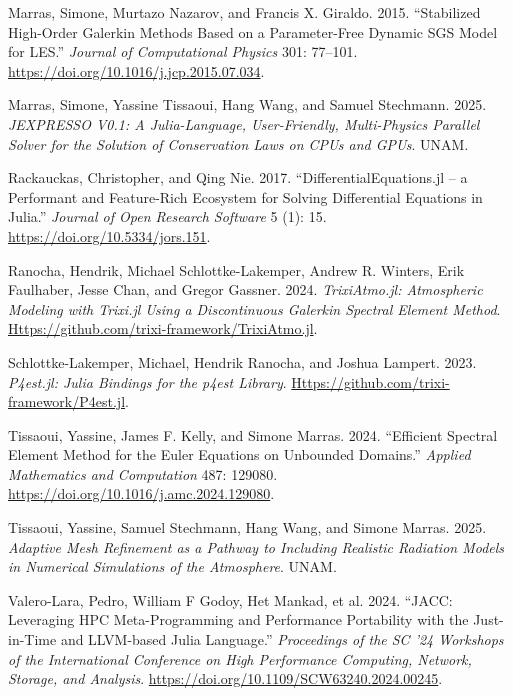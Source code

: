 \documentclass[10pt,onecolumn]{article}
\begin{document}
\begin{CSLReferences}{1}{1}
Marras, Simone, Murtazo Nazarov, and Francis X. Giraldo. 2015.
{``Stabilized High-Order {G}alerkin Methods Based on a Parameter-Free
Dynamic {SGS} Model for {LES}.''} \emph{Journal of Computational
Physics} 301: 77--101. \url{https://doi.org/10.1016/j.jcp.2015.07.034}.

Marras, Simone, Yassine Tissaoui, Hang Wang, and Samuel Stechmann. 2025.
\emph{{JEXPRESSO} V0.1: A {J}ulia-Language, User-Friendly, Multi-Physics
Parallel Solver for the Solution of Conservation Laws on {CPU}s and
{GPU}s}. UNAM.

Rackauckas, Christopher, and Qing Nie. 2017.
{``{DifferentialEquations.jl} -- a Performant and Feature-Rich Ecosystem
for Solving Differential Equations in {J}ulia.''} \emph{Journal of Open
Research Software} 5 (1): 15. \url{https://doi.org/10.5334/jors.151}.

Ranocha, Hendrik, Michael Schlottke-Lakemper, Andrew R. Winters, Erik
Faulhaber, Jesse Chan, and Gregor Gassner. 2024. \emph{{TrixiAtmo.jl}:
Atmospheric Modeling with {T}rixi.jl Using a Discontinuous {G}alerkin
Spectral Element Method}.
\href{https://github.com/trixi-framework/TrixiAtmo.jl}{Https://github.com/trixi-framework/TrixiAtmo.jl}.

Schlottke-Lakemper, Michael, Hendrik Ranocha, and Joshua Lampert. 2023.
\emph{{P4est.jl}: {J}ulia Bindings for the p4est Library}.
\href{https://github.com/trixi-framework/P4est.jl}{Https://github.com/trixi-framework/P4est.jl}.

Tissaoui, Yassine, James F. Kelly, and Simone Marras. 2024. {``Efficient
Spectral Element Method for the {E}uler Equations on Unbounded
Domains.''} \emph{Applied Mathematics and Computation} 487: 129080.
\url{https://doi.org/10.1016/j.amc.2024.129080}.

Tissaoui, Yassine, Samuel Stechmann, Hang Wang, and Simone Marras. 2025.
\emph{Adaptive Mesh Refinement as a Pathway to Including Realistic
Radiation Models in Numerical Simulations of the Atmosphere}. UNAM.

Valero-Lara, Pedro, William F Godoy, Het Mankad, et al. 2024. {``{JACC:
Leveraging HPC Meta-Programming and Performance Portability with the
Just-in-Time and LLVM-based Julia Language}.''} \emph{Proceedings of the
SC '24 Workshops of the International Conference on High Performance
Computing, Network, Storage, and Analysis}.
\url{https://doi.org/10.1109/SCW63240.2024.00245}.

\end{CSLReferences}
\end{document}

